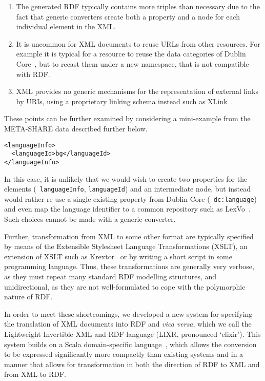 \documentclass{acm_proc_article-sp}
\begin{document}
\begin{enumerate}
\item The generated RDF typically contains more triples than necessary due to the fact that generic
converters create both a property and a node for each individual element in the XML.
\item It is uncommon for XML documents to reuse URLs from other resources. For
example it is typical for a resource to reuse the data categories of Dublin Core~\cite{weibel1998dublin}, 
but to recast them under a new namespace, that is not compatible with RDF.
\item XML provides no generic mechanisms for the representation of external
    links by URIs, using a proprietary linking schema instead such as
    XLink~\cite{derose2001xml}. 
\end{enumerate}

These points can be further examined by considering a mini-example from
the META-SHARE data described further below.

\begin{verbatim}
<languageInfo>
  <languageId>bg</languageId>
</languageInfo>
\end{verbatim}

In this case, it is unlikely that we would wish to create two properties for the 
elements ({\tt 
languageInfo}, {\tt languageId}) and an intermediate node, but instead
would rather re-use a single existing property from Dublin Core ({\tt
dc:language}) and even map the language identifier to a common repository such
as LexVo~\cite{de2008language}. Such choices cannot be made with a 
generic converter.

Further, transformation from XML to some other format are typically specified by means of  the  Extensible Stylesheet Language
Transformations (XSLT), an extension of XSLT such as
Krextor~\cite{lange2009krextor} or 
by writing a short script in some programming language. Thus, these transformations
are generally very verbose, as they must repeat many standard RDF modelling
structures, and unidirectional, as they are not well-formulated to cope with the 
polymorphic nature of RDF.

In order to meet these shortcomings, we developed a new system for specifying the
translation of XML documents into RDF and \emph{vica versa}, which we call the Lightweight Invertible
XML and RDF language (LIXR, pronounced `elixir'). This system builds on a 
Scala domain-specific language~\cite[DSL]{fowler2010domain,wampler2008programming}, which allows the conversion to be
expressed significantly more compactly than existing systems and in a manner
that allows for transformation in both the direction of RDF to XML and from XML
to RDF.
\end{document}
